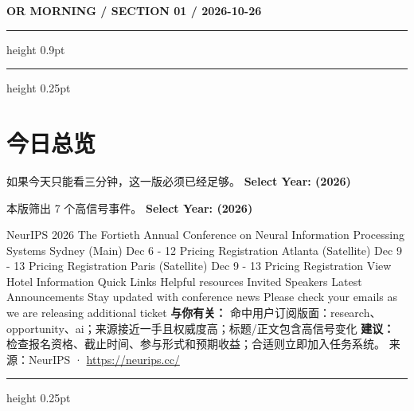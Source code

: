 \documentclass[10.5pt]{ctexart}
\begin{document}
{\small\bfseries OR MORNING / SECTION 01 / 2026-10-26}
\vspace{2mm}
\hrule height 0.9pt
\vspace{1.5mm}
\hrule height 0.25pt
\vspace{4mm}
\section*{今日总览}
{\color{ormuted} 如果今天只能看三分钟，这一版必须已经足够。}
\vspace{2mm}
{\fontsize{25}{29}\selectfont\bfseries Select Year: (2026)}\par
\vspace{2mm}
{\large 本版筛出 7 个高信号事件。}
\vspace{3mm}
{\Large\bfseries Select Year: (2026)}\par
NeurIPS 2026 The Fortieth Annual Conference on Neural Information Processing Systems Sydney (Main) Dec 6 - 12 Pricing Registration Atlanta (Satellite) Dec 9 - 13 Pricing Registration Paris (Satellite) Dec 9 - 13 Pricing Registration View Hotel Information Quick Links Helpful resources Invited Speakers Latest Announcements Stay updated with conference news Please check your emails as we are releasing additional ticket
\textbf{与你有关：} 命中用户订阅版面：research、opportunity、ai；来源接近一手且权威度高；标题/正文包含高信号变化
\textbf{建议：} 检查报名资格、截止时间、参与形式和预期收益；合适则立即加入任务系统。
{\footnotesize\color{ormuted} 来源：NeurIPS · \url{https://neurips.cc/}}
\vspace{3mm}
\hrule height 0.25pt
\vspace{3mm}
\end{document}
